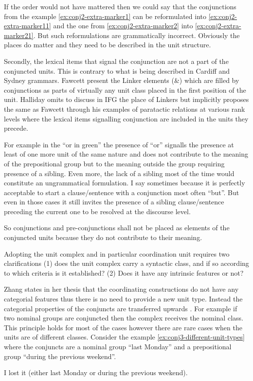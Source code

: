 If the order would not have mattered then we could say that the conjunctions from the example \ref{ex:conj2-extra-marker1} can be reformulated into \ref{ex:conj2-extra-marker11} and the one from \ref{ex:conj2-extra-marker2} into \ref{ex:conj2-extra-marker21}. But such reformulations are grammatically incorrect. Obviously the places do matter and they need to be described in the unit structure. 

Secondly, the lexical items that signal the conjunction are not a part of the conjuncted units. This is contrary to what is being described in Cardiff and Sydney grammars. Fawcett present the Linker elements (\&) which are filled by conjunctions as parts of virtually any unit class placed in the first position of the unit. Halliday omits to discuss in IFG \citep{Halliday2013} the place of Linkers but implicitly proposes the same as Fawcett through his examples of paratactic relations at various rank levels where the lexical items signalling conjunction are included in the units they precede.

For example in the ``or in green'' the presence of ``or'' signalls the presence at least of one more unit of the same nature and does not contribute to the meaning of the prepositional group but to the meaning outside the group requiring presence of a sibling. Even more, the lack of a sibling most of the time would constitute an ungrammatical formulation. I say sometimes because it is perfectly acceptable to start a clause/sentence with a conjunction most often ``but''. But even in those cases it still invites the presence of a sibling clause/sentence preceding the current one to be resolved at the discourse level. 

So conjunctions and pre-conjunctions shall not be placed as elements of the conjuncted units because they do not contribute to their meaning.

Adopting the unit complex and in particular coordination unit requires two clarifications (1) does the unit complex carry a syntactic class, and if so according to which criteria is it established? (2) Does it have any intrinsic features or not?

Zhang states in her thesis that the coordinating constructions do not have any categorial features thus there is no need to provide a new unit type. Instead the categorial properties of the conjuncts are transferred upwards \citep{NinaZhang2010}. For example if two nominal groups are conjuncted then the complex receives the nominal class. This principle holds for most of the cases however there are rare cases when the units are of different classes. Consider the example \ref{ex:conj3-different-unit-types} where the conjuncts are a nominal group ``last Monday'' and a prepositional group ``during the previous weekend''.
\begin{exe}
	\ex\label{ex:conj3-different-unit-types}
	I lost it (either last Monday or during the previous weekend). 
\end{exe}

